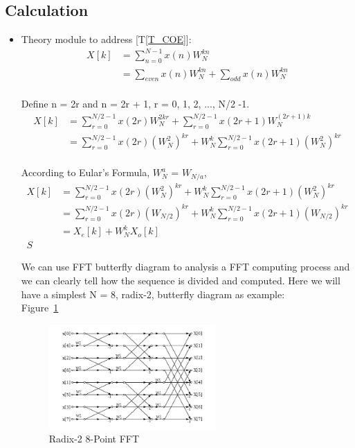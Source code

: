 \documentclass[12pt]{article}
\newcommand{\tref}[1]{T\ref{#1}}
\begin{document}
\subsection{Calculation} \label{sec_Calculation}
\begin{itemize}
\item Theory module to address [\tref{T_COE}]:\\

\begin{align*}
X[k] &= \sum\limits_{n=0}^{N-1}x(n)W_{N}^{kn}\\
& = \sum\limits_{even}x(n)W_{N}^{kn} + \sum\limits_{odd}x(n)W_{N}^{kn}\\
\end{align*}

Define n = 2r and n = 2r + 1, r = 0, 1, 2, ..., N/2 -1.\\

\begin{align*}
X[k] &= \sum\limits_{r=0}^{N/2 -1}x(2r)W_{N}^{2kr} + \sum\limits_{r=0}^{N/2 -1}x(2r+1)W_{N}^{(2r+ 1)k}\\
& =  \sum\limits_{r=0}^{N/2 -1}x(2r)(W_{N}^{2})^{kr} + W_{N}^{k}\sum\limits_{r=0}^{N/2 -1}x(2r+1)(W_{N}^{2})^{kr}\\
\end{align*}

According to Eular's Formula, $W_{N}^{a}$ = $W_{N/a}$,\\

\begin{align*}
X[k] & =  \sum\limits_{r=0}^{N/2 -1}x(2r)(W_{N}^{2})^{kr} + W_{N}^{k}\sum\limits_{r=0}^{N/2 -1}x(2r+1)(W_{N}^{2})^{kr}\\
& = \sum\limits_{r=0}^{N/2 -1}x(2r)(W_{N/2})^{kr} + W_{N}^{k}\sum\limits_{r=0}^{N/2 -1}x(2r+1)(W_{N/2})^{kr}\\
& = X_e[k] + W_N^kX_o[k]\\S
\end{align*}

We can use FFT butterfly diagram to analysis a  FFT computing process and we can clearly tell how the sequence is divided and computed. Here we will have a simplest
N = 8, radix-2, butterfly diagram as example:\\

Figure~\ref{Fig_Radix-2FFT}

\begin{figure}[h!]
\begin{center}
 \includegraphics[width=0.6\textwidth]{butterflyRedix2}
\caption{Radix-2 8-Point FFT}
\label{Fig_Radix-2FFT}
\end{center}
\end{figure}


\end{itemize}
\end{document}
